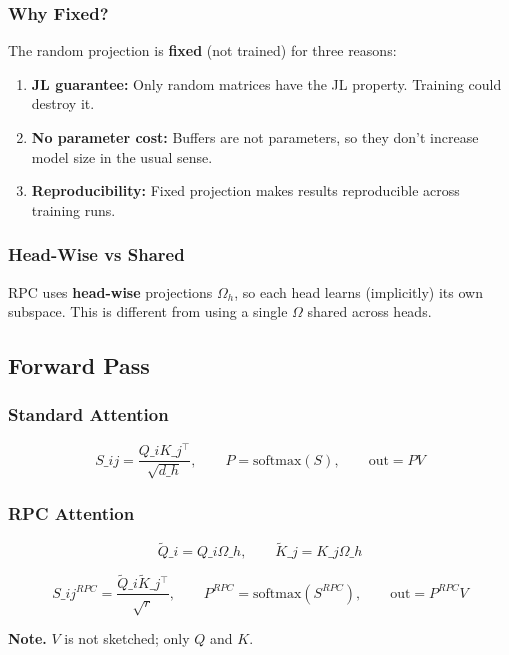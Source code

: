 \subsubsection{Why Fixed?}

The random projection is \textbf{fixed} (not trained) for three reasons:

\begin{enumerate}
\item \textbf{JL guarantee:} Only random matrices have the JL property. Training
  could destroy it.
\item \textbf{No parameter cost:} Buffers are not parameters, so they don't increase
  model size in the usual sense.
\item \textbf{Reproducibility:} Fixed projection makes results reproducible across
  training runs.

\end{enumerate}
\subsubsection{Head-Wise vs Shared}

RPC uses \textbf{head-wise} projections $\Omega_h$, so each head learns (implicitly) 
its own subspace. This is different from using a single $\Omega$ shared 
across heads.

\subsection{Forward Pass}

\subsubsection{Standard Attention}

\[
S\_{ij} = \frac{Q\_i K\_j^\top}{\sqrt{d\_h}}, \qquad
P = \text{softmax}(S), \qquad
\text{out} = P V
\tag{4.2}
\]

\subsubsection{RPC Attention}

\[
\tilde{Q}\_i = Q\_i \Omega\_h, \qquad
\tilde{K}\_j = K\_j \Omega\_h
\tag{4.3}
\]

\[
S\_{ij}^{RPC} = \frac{\tilde{Q}\_i \tilde{K}\_j^\top}{\sqrt{r}}, \qquad
P^{RPC} = \text{softmax}(S^{RPC}), \qquad
\text{out} = P^{RPC} V
\tag{4.4}
\]

\textbf{Note.} $V$ is not sketched; only $Q$ and $K$.

